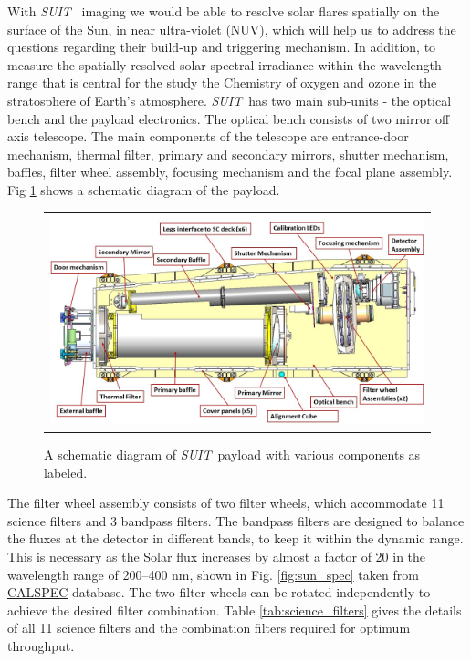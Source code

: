 \documentclass[12pt]{spieman}  %
\newcommand{\suit}{{\it{SUIT}}}
\begin{document}
\noindent With \suit~ imaging we would be able to resolve solar flares spatially on the surface of the Sun, in near ultra-violet (NUV), which will help us to address the questions regarding their build-up and triggering mechanism. In addition, to measure the spatially resolved solar spectral irradiance within the wavelength range that is central for the study the Chemistry of oxygen and ozone in the stratosphere of Earth's atmosphere. \suit~has two main sub-units - the optical bench and the payload electronics. The optical bench consists of two mirror off axis telescope. The main components of the telescope are entrance-door mechanism, thermal filter, primary and secondary mirrors, shutter mechanism, baffles, filter wheel assembly, focusing mechanism and the focal plane assembly. Fig \ref{fig:suit} shows a schematic diagram of the payload.

\begin{figure}[ht!]
\begin{center}
\begin{tabular}{c}
\includegraphics[width=0.8\linewidth]{SUITLayout.jpg}
\end{tabular}
\end{center}
\caption 
{ \label{fig:suit} A schematic diagram of \suit~payload with various components as labeled. } 
\end{figure} 

\noindent The filter wheel assembly consists of two filter wheels, which accommodate 11 science filters and 3 bandpass filters. The bandpass filters are designed to balance the fluxes at the detector in different bands, to keep it within the dynamic range. This is necessary as the Solar flux increases by almost a factor of 20 in the wavelength range of 200{--}400 nm, shown in Fig. \ref{fig:sun_spec} taken from \href{https://www.stsci.edu/hst/instrumentation/reference-data-for-calibration-and-tools/astronomical-catalogs/calspec}{CALSPEC} database. The two filter wheels can be rotated independently to achieve the desired filter combination. Table \ref{tab:science_filters} gives the details of all 11 science filters and the combination filters required for optimum throughput.
\end{document}
